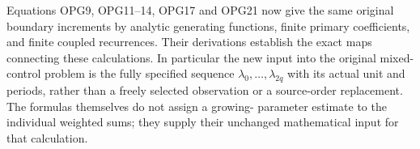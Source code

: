 Equations OPG9, OPG11--14, OPG17 and OPG21 now give the same
original boundary increments by analytic generating functions,
finite primary coefficients, and finite coupled recurrences.
Their derivations establish the exact maps connecting these
calculations. In particular the new input into the original
mixed-control problem is the fully specified sequence
$\lambda_0,\ldots,\lambda_{2q}$ with its actual unit and periods,
rather than a freely selected observation or a source-order
replacement. The formulas themselves do not assign a growing-
parameter estimate to the individual weighted sums; they supply
their unchanged mathematical input for that calculation.

